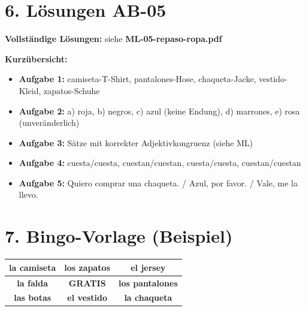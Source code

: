 \documentclass[11pt, a4paper]{article}
\begin{document}

\section*{6. Lösungen AB-05}

\textbf{Vollständige Lösungen:} siehe \textbf{ML-05-repaso-ropa.pdf}

\vspace{5pt}

\textbf{Kurzübersicht:}

\begin{itemize}[nosep, leftmargin=*]
    \item \textbf{Aufgabe 1:} camiseta-T-Shirt, pantalones-Hose, chaqueta-Jacke, vestido-Kleid, zapatos-Schuhe
    \item \textbf{Aufgabe 2:} a) roja, b) negros, c) azul (keine Endung), d) marrones, e) rosa (unveränderlich)
    \item \textbf{Aufgabe 3:} Sätze mit korrekter Adjektivkongruenz (siehe ML)
    \item \textbf{Aufgabe 4:} cuesta/cuesta, cuestan/cuestan, cuesta/cuesta, cuestan/cuestan
    \item \textbf{Aufgabe 5:} Quiero comprar una chaqueta. / Azul, por favor. / Vale, me la llevo.
\end{itemize}


\section*{7. Bingo-Vorlage (Beispiel)}

\begin{center}
\begin{tabular}{|c|c|c|}
\hline
\textbf{la camiseta} & \textbf{los zapatos} & \textbf{el jersey} \\
\hline
\textbf{la falda} & \textbf{GRATIS} & \textbf{los pantalones} \\
\hline
\textbf{las botas} & \textbf{el vestido} & \textbf{la chaqueta} \\
\hline
\end{tabular}
\end{center}
\end{document}
